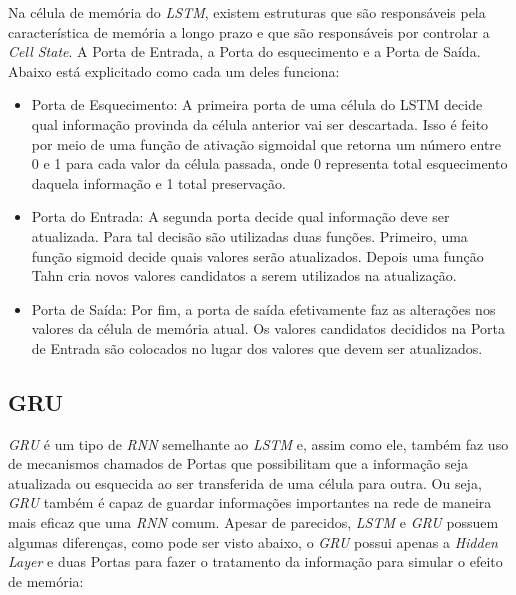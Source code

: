 Na célula de memória do \textit{\acrshort{LSTM}}, existem estruturas que são responsáveis pela característica de memória a longo prazo e que são responsáveis por controlar a \textit{Cell State}. A Porta de Entrada, a Porta do esquecimento e a Porta de Saída. Abaixo está explicitado como cada um deles funciona:
\begin{itemize}
  \item Porta de Esquecimento: A primeira porta de uma célula do \acrfull{LSTM} decide qual informação provinda da célula anterior vai ser descartada. Isso é feito por meio de uma função de ativação sigmoidal que retorna um número entre 0 e 1 para cada valor da célula passada, onde 0 representa total esquecimento daquela informação e 1 total preservação.
  
  \item Porta do Entrada: A segunda porta decide qual informação deve ser atualizada. Para tal decisão são utilizadas duas funções. Primeiro, uma função sigmoid decide quais valores serão atualizados. Depois uma função Tahn cria novos valores candidatos a serem utilizados na atualização.
  \item Porta de Saída: Por fim, a porta de saída efetivamente faz as alterações nos valores da célula de memória atual. Os valores candidatos decididos na Porta de Entrada são colocados no lugar dos valores que devem ser atualizados.
\end{itemize}



\subsection{\acrfull{GRU}}





\textit{\acrshort{GRU}} é um tipo de \textit{\acrshort{RNN}} semelhante ao \textit{\acrshort{LSTM}} e, assim como ele, também faz uso de mecanismos chamados de Portas que possibilitam que a informação seja atualizada ou esquecida ao ser transferida de uma célula para outra. Ou seja, \textit{\acrshort{GRU}} também é capaz de guardar informações importantes na rede de maneira mais eficaz que uma \textit{\acrshort{RNN}} comum. Apesar de parecidos, \textit{\acrshort{LSTM}} e \textit{\acrshort{GRU}} possuem algumas diferenças, como pode ser visto abaixo, o \textit{\acrshort{GRU}} possui apenas a \textit{Hidden Layer} e duas Portas para fazer o tratamento da informação para simular o efeito de memória:

